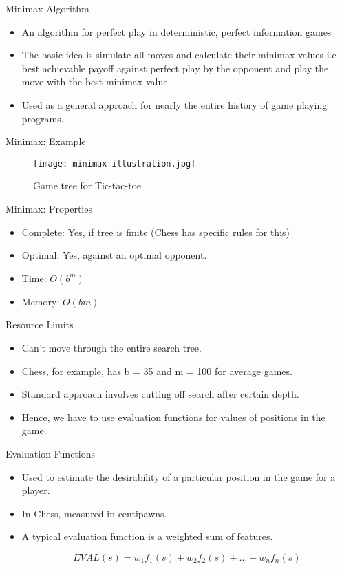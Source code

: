 \documentclass{beamer}
\begin{document}
\begin{frame}{Minimax Algorithm}
  \begin{itemize}
    \item An algorithm for perfect play in deterministic, perfect information games
    \item The basic idea is simulate all moves and calculate their minimax values i.e best achievable payoff against perfect play by the opponent and play the move with the best minimax value.
    \item Used as a general approach for nearly the entire history of game playing programs.
  \end{itemize}
\end{frame}

\begin{frame}{Minimax: Example}

  \begin{figure}[htbp]
  \centering
  \texttt{[image: minimax-illustration.jpg]}
  \caption{Game tree for Tic-tac-toe}
  \label{artist_graph}
  \end{figure}
\end{frame}

\begin{frame}{Minimax: Properties}
  \begin{itemize}
    \item Complete: Yes, if tree is finite (Chess has specific rules for this)
    \item Optimal: Yes, against an optimal opponent.
    \item Time: \(O(b^m)\)
    \item Memory: \(O(bm)\)
  \end{itemize}
\end{frame}

\begin{frame}{Resource Limits}
  \begin{itemize}
    \item Can't move through the entire search tree.
    \item Chess, for example, has b = 35 and m = 100 for average games.
    \item Standard approach involves cutting off search after certain depth.
    \item Hence, we have to use evaluation functions for values of positions in the game.
  \end{itemize}
\end{frame}

\begin{frame}{Evaluation Functions}
  \begin{itemize}
    \item Used to estimate the desirability of a particular position in the game for a player.
    \item In Chess, measured in centipawns.
    \item {
      A typical evaluation function is a weighted sum of features.

      \[EVAL(s) = w_1 f_1(s) + w_2  f_2(s) + \ldots + w_n  f_n(s)\]
    }
  \end{itemize}
\end{frame}
\end{document}
